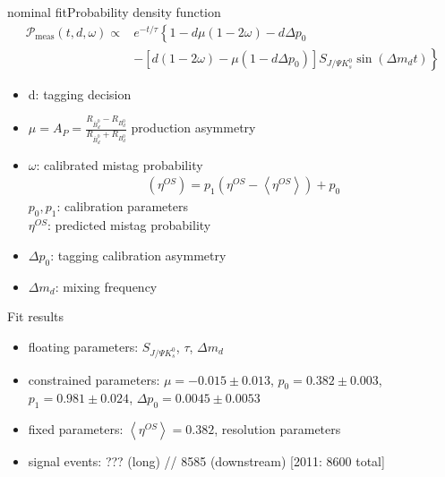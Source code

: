 \documentclass{beamer}
\newcommand{\SJPsi}{S_{J/\Psi K_s^0}}
\begin{document}
	\begin{frame}{nominal fit}{Probability density function}
	\begin{align}
\nonumber\mathcal{P}_{\text{meas}}(t, d, \omega) \propto &e^{-t/\tau} \left\lbrace 1-d\mu(1-2\omega)-d\Delta p_0 \right. \\
&- \left.\left[d(1-2\omega)-\mu(1-d\Delta p_0)\right]\SJPsi\sin(\Delta m_d t)\right\rbrace
	\end{align}
	
	\begin{itemize}
		\item d: tagging decision
		\item $\mu = A_P = \frac{R_{\bar{B}_d^0}-R_{B_d^0}}{R_{\bar{B}_d^0}+R_{B_d^0}}$ production asymmetry
		\item $\omega$: calibrated mistag probability
		      \begin{align}
		      (\eta^{OS}) = p_1 (\eta^{OS} - \left\langle \eta^{OS} \right\rangle) + p_0
		      \end{align}
		      $p_0, p_1$: calibration parameters \\
		      $\eta^{OS}$: predicted mistag probability
		\item $\Delta p_0$: tagging calibration asymmetry
		\item $\Delta m_d$: mixing frequency

	\end{itemize}	
	\end{frame}
	
	
	
	\begin{frame}{Fit results}
	\begin{itemize}
		\item floating parameters: $S_{J/\Psi K_s^0}$, $\tau$, $\Delta m_d$
		\item constrained parameters: $\mu = -0.015\pm0.013$, $p_0 = 0.382\pm0.003$, $p_1=0.981\pm0.024$, $\Delta p_0 = 0.0045\pm0.0053$
		\item fixed parameters: $\left\langle \eta^{OS} \right\rangle = 0.382$, resolution parameters
		\item signal events: ??? (long) // 8585 (downstream) [2011: 8600 total]
	\end{itemize}
	\end{frame}
\end{document}

